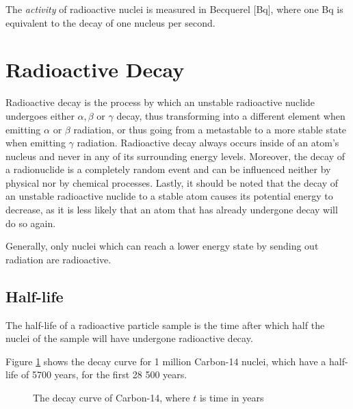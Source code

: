 The \emph{activity} of radioactive nuclei is measured in Becquerel [Bq], where one Bq is equivalent to the decay of one nucleus per second.

\pagebreak

\chapter*{Radioactive Decay}

Radioactive decay is the process by which an unstable radioactive nuclide undergoes either $\alpha, \beta$ or $\gamma$ decay, thus transforming into a different element when emitting $\alpha$ or $\beta$ radiation, or thus going from a metastable to a more stable state when emitting $\gamma$ radiation. Radioactive decay always occurs inside of an atom's nucleus and never in any of its surrounding energy levels. Moreover, the decay of a radionuclide is a completely random event and can be influenced neither by physical nor by chemical processes. Lastly, it should be noted that the decay of an unstable radioactive nuclide to a stable atom causes its potential energy to decrease, as it is less likely that an atom that has already undergone decay will do so again.

Generally, only nuclei which can reach a lower energy state by sending out radiation are radioactive.

\section*{Half-life}

The half-life of a radioactive particle sample is the time after which half the nuclei of the sample will have undergone radioactive decay.

Figure \ref{fig:decay} shows the decay curve for 1 million Carbon-14 nuclei, which have a half-life of 5700 years, for the first 28 500 years.

\begin{figure}[h!]
\centering
\caption{The decay curve of Carbon-14, where $t$ is time in years}
\label{fig:decay}
\end{figure}

